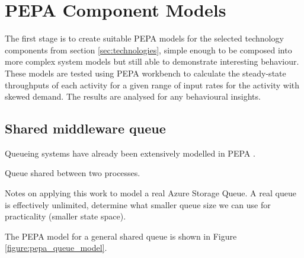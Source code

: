 %
%

\section{PEPA Component Models}\label{sec:pepa-component-models}

The first stage is to create suitable PEPA models for the selected technology components from section \ref{sec:technologies}, simple enough to be composed into more complex system models but still able to demonstrate interesting behaviour.  These models are tested using PEPA workbench \cite{RN51} to calculate the steady-state throughputs of each activity for a given range of input rates for the activity with skewed demand.  The results are analysed for any behavioural insights.

%
%
\subsection{Shared middleware queue}

\begin{shaded}
Queueing systems have already been extensively modelled in PEPA \cite{RN75}.

Queue shared between two processes.

Notes on applying this work to model a real Azure Storage Queue.  A real queue is effectively unlimited, determine what smaller queue size we can use for practicality (smaller state space). 

The PEPA model for a general shared queue is shown in Figure \ref{figure:pepa_queue_model}.
\end{shaded}

